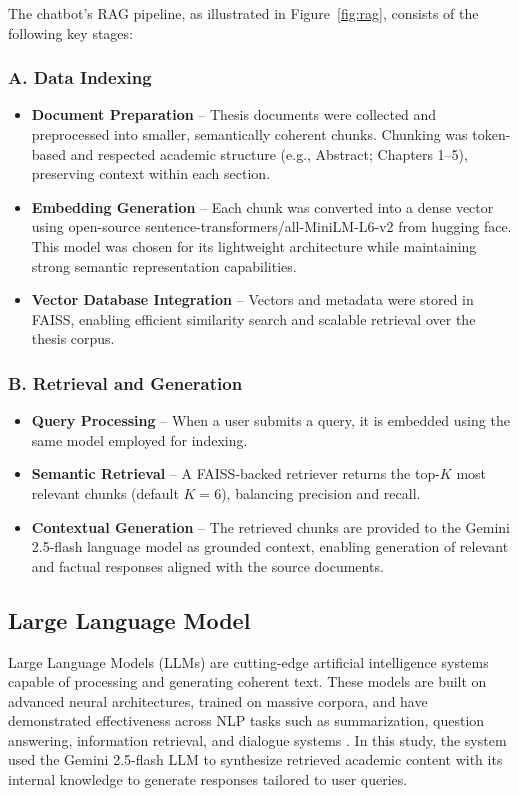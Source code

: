 \begin{refsection}
The chatbot’s RAG pipeline, as illustrated in Figure~\ref{fig:rag}, consists of the following key stages:

\subsubsection{A. Data Indexing}
\begin{itemize}
    \item \textbf{Document Preparation} – Thesis documents were collected and preprocessed into smaller, semantically coherent chunks. Chunking was token-based and respected academic structure (e.g., Abstract; Chapters 1--5), preserving context within each section.
    \item \textbf{Embedding Generation} – Each chunk was converted into a dense vector using open-source sentence-transformers/all-MiniLM-L6-v2 from hugging face. This model was chosen for its lightweight architecture while maintaining strong semantic representation capabilities.
    \item \textbf{Vector Database Integration} – Vectors and metadata were stored in FAISS, enabling efficient similarity search and scalable retrieval over the thesis corpus.
\end{itemize}

\subsubsection{B. Retrieval and Generation}
\begin{itemize}
    \item \textbf{Query Processing} – When a user submits a query, it is embedded using the same model employed for indexing.
    \item \textbf{Semantic Retrieval} – A FAISS-backed retriever returns the top-$K$ most relevant chunks (default $K=6$), balancing precision and recall.
    \item \textbf{Contextual Generation} – The retrieved chunks are provided to the Gemini 2.5-flash language model as grounded context, enabling generation of relevant and factual responses aligned with the source documents.
\end{itemize}


\subsection{Large Language Model}

Large Language Models (LLMs) are cutting-edge artificial intelligence systems capable of processing and generating coherent text. These models are built on advanced neural architectures, trained on massive corpora, and have demonstrated effectiveness across NLP tasks such as summarization, question answering, information retrieval, and dialogue systems \citeauthor{naveed2024} \citeyear{naveed2024}. In this study, the system used the Gemini 2.5-flash LLM to synthesize retrieved academic content with its internal knowledge to generate responses tailored to user queries.



\end{refsection}
